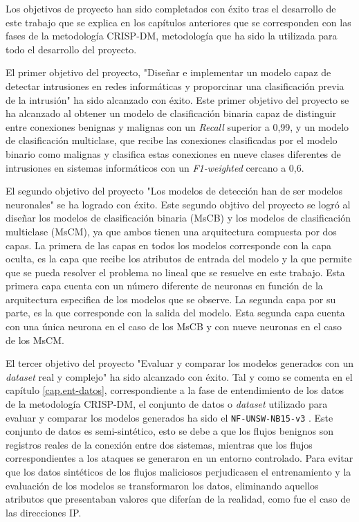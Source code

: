 Los objetivos de proyecto han sido completados con éxito tras el desarrollo de este trabajo que se explica en los capítulos anteriores que se corresponden con las fases de la metodología CRISP-DM, metodología que ha sido la utilizada para todo el desarrollo del proyecto.

El primer objetivo del proyecto, "Diseñar e implementar un modelo capaz de detectar intrusiones en redes informáticas y proporcinar una clasificación previa de la intrusión" ha sido alcanzado con éxito. Este primer objetivo del proyecto se ha alcanzado al obtener un modelo de clasificación binaria capaz de distinguir entre conexiones benignas y malignas con un \textit{Recall} superior a 0,99, y un modelo de clasificación multiclase, que recibe las conexiones clasificadas por el modelo binario como malignas y clasifica estas conexiones en nueve clases diferentes de intrusiones en sistemas informáticos con un \textit{F1-weighted} cercano a 0,6.

El segundo objetivo del proyecto "Los modelos de detección han de ser modelos neuronales" se ha logrado con éxito. Este segundo objtivo del proyecto se logró al diseñar los modelos de clasificación binaria (MsCB) y los modelos de clasificación multiclase (MsCM), ya que ambos tienen una arquitectura compuesta por dos capas. La primera de las capas en todos los modelos corresponde con la capa oculta, es la capa que recibe los atributos de entrada del modelo y la que permite que se pueda resolver el problema no lineal que se resuelve en este trabajo. Esta primera capa cuenta con un número diferente de neuronas en función de la arquitectura especifica de los modelos que se observe. La segunda capa por su parte, es la que corresponde con la salida del modelo. Esta segunda capa cuenta con una única neurona en el caso de los MsCB y con nueve neuronas en el caso de los MsCM.

El tercer objetivo del proyecto "Evaluar y comparar los modelos generados con un \textit{dataset} real y complejo" ha sido alcanzado con éxito. Tal y como se comenta en el capítulo \ref{cap.ent-datos}, correspondiente a la fase de entendimiento de los datos de la metodología CRISP-DM, el conjunto de datos o \textit{dataset} utilizado para evaluar y comparar los modelos generados ha sido el \texttt{NF-UNSW-NB15-v3} \cite{luay2025NetFlowDatasetsV3}. Este conjunto de datos es semi-sintético, esto se debe a que los flujos benignos son registros reales de la conexión entre dos sistemas, mientras que los flujos correspondientes a los ataques se generaron en un entorno controlado. Para evitar que los datos sintéticos de los flujos maliciosos perjudicasen el entrenamiento y la evaluación de los modelos se transformaron los datos, eliminando aquellos atributos que presentaban valores que diferían de la realidad, como fue el caso de las direcciones IP.

